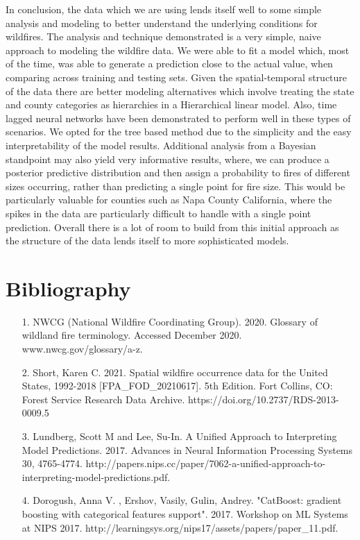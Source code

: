 \documentclass[12pt]{article}
\begin{document}
In conclusion, the data which we are using lends itself well to some simple analysis and modeling to better understand the underlying conditions for wildfires. The analysis and technique demonstrated is a very simple, naive approach to modeling the wildfire data. We were able to fit a model which, most of the time, was able to generate a prediction close to the actual value, when comparing across training and testing sets. Given the spatial-temporal structure of the data there are better modeling alternatives which involve treating the state and county categories as hierarchies in a Hierarchical linear model. Also, time lagged neural networks have been demonstrated to perform well in these types of scenarios. We opted for the tree based method due to the simplicity and the easy interpretability of the model results. Additional analysis from a Bayesian standpoint may also yield very informative results, where, we can produce a posterior predictive distribution and then assign a probability to fires of different sizes occurring, rather than predicting a single point for fire size. This would be particularly valuable for counties such as Napa County California, where the spikes in the data are particularly difficult to handle with a single point prediction. Overall there is a lot of room to build from this initial approach as the structure of the data lends itself to more sophisticated models.


\pagebreak

\section*{\textrm{Bibliography}}

\begin{raggedright}

\begin{enumerate} 
\item[1.] NWCG (National Wildfire Coordinating Group). 2020. Glossary of wildland fire terminology. Accessed December 2020. www.nwcg.gov/glossary/a-z.


\item[2.] Short, Karen C. 2021. Spatial wildfire occurrence data for the United States, 1992-2018 [FPA\_FOD\_20210617]. 5th Edition. Fort Collins, CO: Forest Service Research Data Archive. https://doi.org/10.2737/RDS-2013-0009.5

\item[3.] Lundberg, Scott M and Lee, Su-In. A Unified Approach to Interpreting Model Predictions. 2017. Advances in Neural Information Processing Systems 30, 4765-4774. http://papers.nips.cc/paper/7062-a-unified-approach-to-interpreting-model-predictions.pdf. 

\item[4.] Dorogush, Anna V. , Ershov, Vasily, Gulin, Andrey.  "CatBoost: gradient boosting with categorical features support". 2017. Workshop on ML Systems at NIPS 2017. http://learningsys.org/nips17/assets/papers/paper\_11.pdf. 


\end{enumerate}

\end{raggedright}
\end{document}
